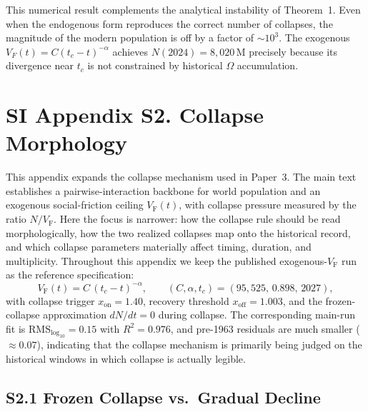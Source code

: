\documentclass[11pt]{article}
\newcommand{\VF}{V_{\mathrm{F}}}
\newcommand{\xon}{x_{\mathrm{on}}}
\newcommand{\xoff}{x_{\mathrm{off}}}
\begin{document}
\noindent This numerical result complements the analytical instability of Theorem~1.
Even when the endogenous form reproduces the correct number of collapses, the magnitude of the modern population is off by a factor of $\sim 10^3$.
The exogenous $V_F(t) = C(t_c - t)^{-\alpha}$ achieves $N(2024) = 8{,}020$\,M precisely because its divergence near $t_c$ is not constrained by historical $\Omega$ accumulation.

\pagebreak


\section*{SI Appendix S2. Collapse Morphology}

This appendix expands the collapse mechanism used in Paper~3. The main text establishes a pairwise-interaction backbone for world population and an exogenous social-friction ceiling $\VF(t)$, with collapse pressure measured by the ratio $N/\VF$. Here the focus is narrower: how the collapse rule should be read morphologically, how the two realized collapses map onto the historical record, and which collapse parameters materially affect timing, duration, and multiplicity. Throughout this appendix we keep the published exogenous-$\VF$ run as the reference specification:
\begin{equation}
\VF(t)=C\,(t_c-t)^{-\alpha},\qquad(C,\alpha,t_c)=(95{,}525,\,0.898,\,2027),
\end{equation}
with collapse trigger $\xon=1.40$, recovery threshold $\xoff=1.003$, and the frozen-collapse approximation $dN/dt=0$ during collapse. The corresponding main-run fit is $\mathrm{RMS}_{\log_{10}}=0.15$ with $R^2=0.976$, and pre-1963 residuals are much smaller ($\approx 0.07$), indicating that the collapse mechanism is primarily being judged on the historical windows in which collapse is actually legible.

\subsection*{S2.1 Frozen Collapse vs.\ Gradual Decline}
\end{document}
